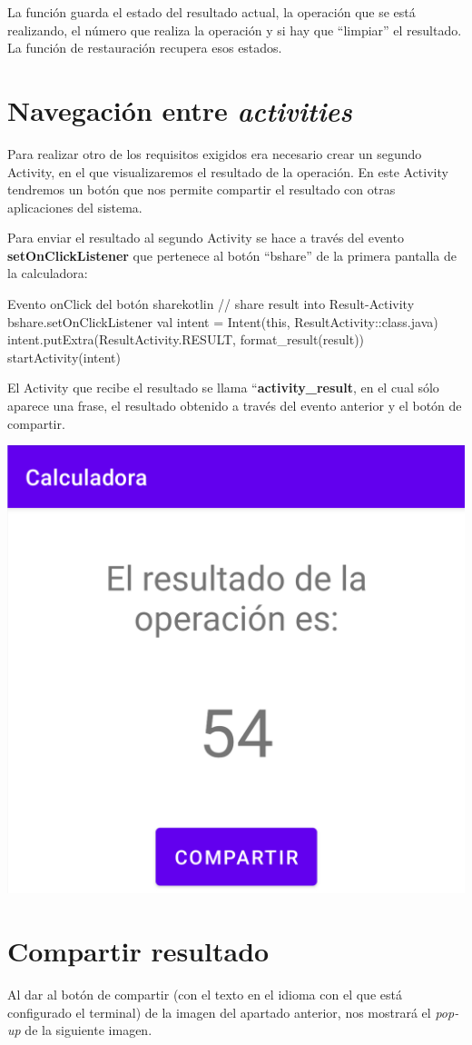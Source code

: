 \documentclass{\ClassPath/viu-tfm-template}
\begin{document}
La función guarda el estado del resultado actual, la operación que se está realizando, el número que realiza la operación y si hay que “limpiar” el resultado. La función de restauración recupera esos estados.

\section{Navegación entre \textit{activities}}

Para realizar otro de los requisitos exigidos era necesario crear un segundo Activity, en el que visualizaremos el resultado de la operación. En este Activity tendremos un botón que nos permite compartir el resultado con otras aplicaciones del sistema.


Para enviar el resultado al segundo Activity se hace a través del evento \textbf{setOnClickListener} que pertenece al botón “bshare” de la primera pantalla de la calculadora:

\begin{mycode}{Evento onClick del botón share}{kotlin}{}
// share result into Result-Activity
bshare.setOnClickListener {
    val intent = Intent(this, ResultActivity::class.java)
    intent.putExtra(ResultActivity.RESULT, format_result(result))
    startActivity(intent)
}
\end{mycode}


El Activity que recibe el resultado se llama “\textbf{activity\_result}, en el cual sólo aparece una frase, el resultado obtenido a través del evento anterior y el botón de compartir.

\begin{center}
    \includegraphics[frame,width=0.33\linewidth]{img/castellano.png}
\end{center}


\section{Compartir resultado}

Al dar al botón de compartir (con el texto en el idioma con el que está configurado el terminal) de la imagen del apartado anterior, nos mostrará el \textit{pop-up} de la siguiente imagen.
\end{document}
